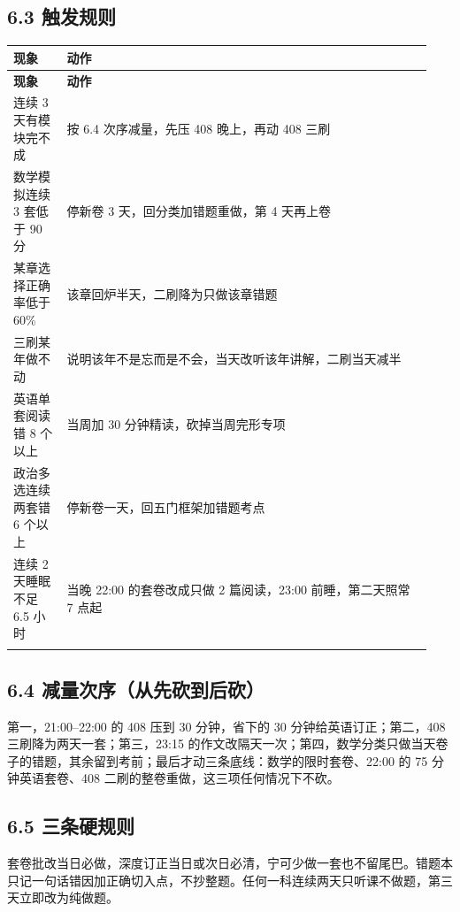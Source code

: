 \documentclass[UTF8,a4paper,11pt]{ctexart}
\begin{document}
\subsection{6.3 触发规则}
{\small\renewcommand{\arraystretch}{1.38}\setlength{\tabcolsep}{3.5pt}
\begin{longtable}{P{0.12\linewidth}P{0.82\linewidth}}
\toprule
\bfseries 现象 & \bfseries 动作 \\
\midrule
\endfirsthead
\toprule
\bfseries 现象 & \bfseries 动作 \\
\midrule
\endhead
连续 3 天有模块完不成 & 按 6.4 次序减量，先压 408 晚上，再动 408 三刷 \\
\addlinespace[.35em]
数学模拟连续 3 套低于 90 分 & 停新卷 3 天，回分类加错题重做，第 4 天再上卷 \\
 某章选择正确率低于 60\% & 该章回炉半天，二刷降为只做该章错题 \\
 三刷某年做不动 & 说明该年不是忘而是不会，当天改听该年讲解，二刷当天减半 \\
\addlinespace[.35em]
英语单套阅读错 8 个以上 & 当周加 30 分钟精读，砍掉当周完形专项 \\
\addlinespace[.35em]
政治多选连续两套错 6 个以上 & 停新卷一天，回五门框架加错题考点 \\
\addlinespace[.35em]
连续 2 天睡眠不足 6.5 小时 & 当晚 22:00 的套卷改成只做 2 篇阅读，23:00 前睡，第二天照常 7 点起 \\
\addlinespace[.35em]
\bottomrule
\end{longtable}
}
\subsection{6.4 减量次序（从先砍到后砍）}
第一，21:00–22:00 的 408 压到 30 分钟，省下的 30 分钟给英语订正；第二，408 三刷降为两天一套；第三，23:15 的作文改隔天一次；第四，数学分类只做当天卷子的错题，其余留到考前；最后才动三条底线：数学的限时套卷、22:00 的 75 分钟英语套卷、408 二刷的整卷重做，这三项任何情况下不砍。

\subsection{6.5 三条硬规则}
套卷批改当日必做，深度订正当日或次日必清，宁可少做一套也不留尾巴。错题本只记一句话错因加正确切入点，不抄整题。任何一科连续两天只听课不做题，第三天立即改为纯做题。
\end{document}
